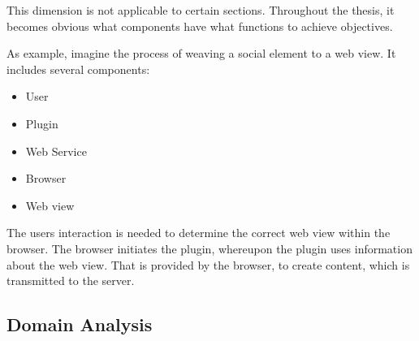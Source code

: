 This dimension is not applicable to certain sections. Throughout the thesis, it becomes obvious what components have what functions to achieve objectives. 

As example, imagine the process of weaving a social element to a web view. It includes several components:
\begin{itemize}
	\item User
	\item Plugin
	\item Web Service
	\item Browser
	\item Web view
\end{itemize}

The users interaction is needed to determine the correct web view within the browser. The browser initiates the plugin, whereupon the plugin uses information about the web view. That is provided by the browser, to create content, which is transmitted to the server. 

\newpage
\subsection{Domain Analysis}\label{domainAnalysis}

